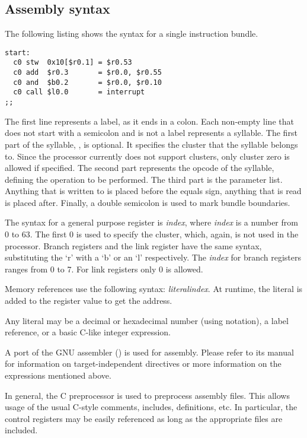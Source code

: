  
\subsection{Assembly syntax}
\label{sec:core-ug-isa-assembly}

The following listing shows the syntax for a single instruction bundle.

\begin{lstlisting}[numbers=none, basicstyle=\footnotesize, language=vexasm]
start:
  c0 stw  0x10[$r0.1] = $r0.53
  c0 add  $r0.3       = $r0.0, $r0.55
  c0 and  $b0.2       = $r0.0, $r0.10
  c0 call $l0.0       = interrupt
;;
\end{lstlisting}

The first line represents a label, as it ends in a colon. Each non-empty line 
that does not start with a semicolon and is not a label represents a syllable. 
The first part of the syllable, , is optional. It specifies the cluster 
that the syllable belongs to. Since the \rvex{} processor currently does not 
support clusters, only cluster zero is allowed if specified. The second part 
represents the opcode of the syllable, defining the operation to be performed. 
The third part is the parameter list. Anything that is written to is placed 
before the equals sign, anything that is read is placed after. Finally, a 
double semicolon is used to mark bundle boundaries.

The syntax for a general purpose register is \textit{index}, where 
\textit{index} is a number from 0 to 63. The first 0 is used to specify the 
cluster, which, again, is not used in the \rvex{} processor. Branch registers 
and the link register have the same syntax, substituting the `r' with a `b' or 
an `l' respectively. The \textit{index} for branch registers ranges from 0 to 7. 
For link registers only 0 is allowed.

Memory references use the following syntax:
\textit{literal}\code{[$r0.}\textit{index}\code{]}. At runtime, the literal is
added to the register value to get the address.

Any literal may be a decimal or hexadecimal number (using  notation),
a label reference, or a basic C-like integer expression.

A port of the GNU assembler () is used for assembly. Please refer to
its manual for information on target-independent directives or more information
on the expressions mentioned above.

In general, the C preprocessor is used to preprocess assembly files. This allows
usage of the usual C-style comments, includes, definitions, etc. In particular,
the control registers may be easily referenced as long as the appropriate files
are included.

